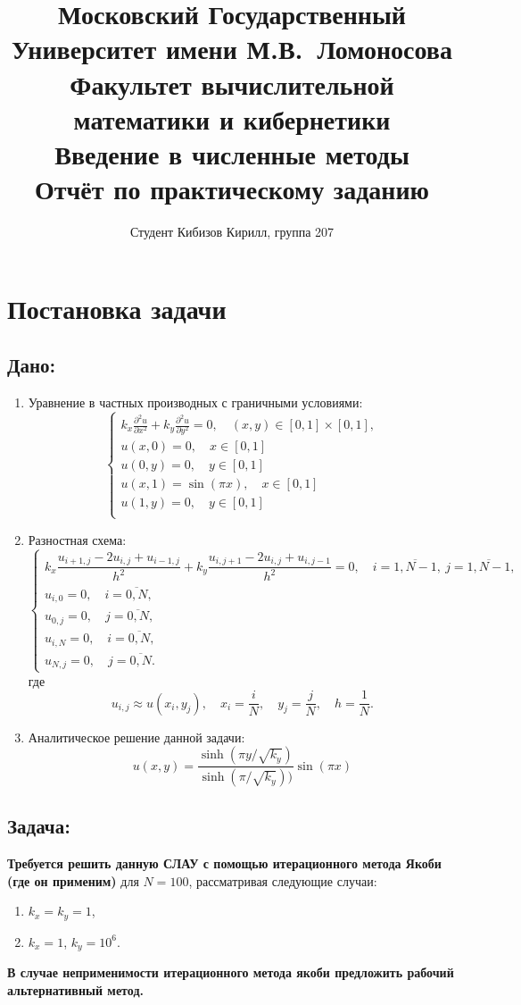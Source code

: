 \documentclass[a4paper, fleqn]{report}
\title{
\textbf{Московский Государственный Университет имени М.В.\ Ломоносова}\\
\textbf{Факультет вычислительной математики и кибернетики}\\
\textbf{Введение в численные методы}\\
Отчёт по практическому заданию
}
\author{
Студент Кибизов Кирилл, группа 207
}
\date{\number\year}
\begin{document}
\maketitle

\tableofcontents

\chapter{Постановка задачи}

\section*{Дано:}
\begin{enumerate}[label=\arabic*.]
\item Уравнение в частных производных с граничными условиями:
\[
\begin{cases}
k_x \frac{\partial^2 u}{\partial x^2} + k_y \frac{\partial^2 u}{\partial y^2} = 0, \quad (x, y) \in [0, 1] \times [0, 1], \\
u(x, 0) = 0, \quad x \in [0, 1] \\
u(0, y) = 0, \quad y \in [0, 1] \\
u(x, 1) = \sin(\pi x), \quad x \in [0, 1] \\
u(1, y) = 0, \quad y \in [0, 1] \\
\end{cases}
\]
\item Разностная схема:
\[
\begin{cases}
k_x \dfrac{u_{i+1,j} - 2u_{i,j} + u_{i-1,j}}{h^2} + k_y \dfrac{u_{i,j+1} - 2u_{i,j} + u_{i,j-1}}{h^2} = 0, \quad i = \overline{1,N-1},\ j = \overline{1,N-1}, \\
u_{i,0} = 0, \quad i = \overline{0,N}, \\
u_{0,j} = 0, \quad j = \overline{0,N}, \\
u_{i,N} = 0, \quad i = \overline{0,N}, \\
u_{N,j} = 0, \quad j = \overline{0,N}.
\end{cases}
\]
где
\[
u_{i,j} \approx u(x_i, y_j), \quad x_i = \dfrac{i}{N}, \quad y_j = \dfrac{j}{N}, \quad h = \dfrac{1}{N}.
\]
\item Аналитическое решение данной задачи:
\[
u(x, y) = \dfrac{\sinh(\pi y / \sqrt{k_y})}{\sinh(\pi / \sqrt{k_y}))} \sin(\pi x)
\]
\end{enumerate}

\section*{Задача:}
\textbf{Требуется решить данную СЛАУ с помощью итерационного метода Якоби (где он применим)} для $N = 100$, рассматривая следующие случаи:
\begin{enumerate}
    \item $k_x = k_y = 1$,
    \item $k_x = 1$, $k_y = 10^6$.
\end{enumerate}
\textbf{В случае неприменимости итерационного метода якоби предложить рабочий альтернативный метод.}
\end{document}
